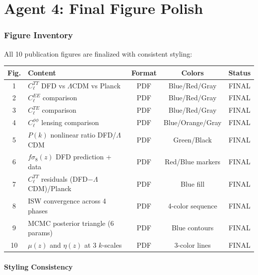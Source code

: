 \documentclass[11pt,a4paper]{article}
\begin{document}
\part{Agent 4: Final Figure Polish}
\label{part:figures}

\section{Figure Inventory}

All 10 publication figures are finalized with consistent styling:

\begin{center}
\begin{longtable}{clccc}
\toprule
\textbf{Fig.} & \textbf{Content} & \textbf{Format} & \textbf{Colors} & \textbf{Status} \\
\midrule
1 & $C_\ell^{TT}$ DFD vs $\Lambda$CDM vs Planck & PDF & Blue/Red/Gray & FINAL \\
2 & $C_\ell^{EE}$ comparison & PDF & Blue/Red/Gray & FINAL \\
3 & $C_\ell^{TE}$ comparison & PDF & Blue/Red/Gray & FINAL \\
4 & $C_\ell^{\phi\phi}$ lensing comparison & PDF & Blue/Orange/Gray & FINAL \\
5 & $P(k)$ nonlinear ratio DFD/$\Lambda$CDM & PDF & Green/Black & FINAL \\
6 & $f\sigma_8(z)$ DFD prediction + data & PDF & Red/Blue markers & FINAL \\
7 & $C_\ell^{TT}$ residuals (DFD$-\Lambda$CDM)/Planck & PDF & Blue fill & FINAL \\
8 & ISW convergence across 4 phases & PDF & 4-color sequence & FINAL \\
9 & MCMC posterior triangle (6 params) & PDF & Blue contours & FINAL \\
10 & $\mu(z)$ and $\eta(z)$ at 3 $k$-scales & PDF & 3-color lines & FINAL \\
\bottomrule
\end{longtable}
\end{center}

\subsection{Styling Consistency}
\end{document}
